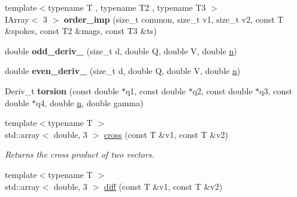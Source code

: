 \begin{DoxyCompactItemize}
\item 
{\footnotesize template$<$typename T , typename T2 , typename T3 $>$ }\\I\+Array$<$ 3 $>$ {\bfseries order\+\_\+imp} (size\+\_\+t common, size\+\_\+t v1, size\+\_\+t v2, const T \&spokes, const T2 \&mags, const T3 \&ts)\hypertarget{namespaceFManII_abbb76098dc0ce293eb77c39ea451ecec}{}\label{namespaceFManII_abbb76098dc0ce293eb77c39ea451ecec}

\item 
double {\bfseries odd\+\_\+deriv\+\_\+} (size\+\_\+t d, double Q, double V, double \hyperlink{namespaceFManII_ab331802fde4c5f2564443f1704c25363a351f38f2149aa0e3be56f7c5aa16eae9}{n})\hypertarget{namespaceFManII_a4d1c3cdc99779ef25b59ec9bce04bc3f}{}\label{namespaceFManII_a4d1c3cdc99779ef25b59ec9bce04bc3f}

\item 
double {\bfseries even\+\_\+deriv\+\_\+} (size\+\_\+t d, double Q, double V, double \hyperlink{namespaceFManII_ab331802fde4c5f2564443f1704c25363a351f38f2149aa0e3be56f7c5aa16eae9}{n})\hypertarget{namespaceFManII_a15ad94b985d81cac64aaca5c84f8d06e}{}\label{namespaceFManII_a15ad94b985d81cac64aaca5c84f8d06e}

\item 
Deriv\+\_\+t {\bfseries torsion} (const double $\ast$q1, const double $\ast$q2, const double $\ast$q3, const double $\ast$q4, double \hyperlink{namespaceFManII_ab331802fde4c5f2564443f1704c25363a351f38f2149aa0e3be56f7c5aa16eae9}{n}, double gamma)\hypertarget{namespaceFManII_a4d60b97475fdf4736295110c685e1f8b}{}\label{namespaceFManII_a4d60b97475fdf4736295110c685e1f8b}

\item 
{\footnotesize template$<$typename T $>$ }\\std\+::array$<$ double, 3 $>$ \hyperlink{namespaceFManII_ab6c3ba0221d1479590c328071add3a69}{cross} (const T \&v1, const T \&v2)\hypertarget{namespaceFManII_ab6c3ba0221d1479590c328071add3a69}{}\label{namespaceFManII_ab6c3ba0221d1479590c328071add3a69}

\begin{DoxyCompactList}\small\item\em Returns the cross product of two vectors. \end{DoxyCompactList}\item 
{\footnotesize template$<$typename T $>$ }\\std\+::array$<$ double, 3 $>$ \hyperlink{namespaceFManII_a67d2288b51cdc78b0569812bbbe7603c}{diff} (const T \&v1, const T \&v2)\hypertarget{namespaceFManII_a67d2288b51cdc78b0569812bbbe7603c}{}\label{namespaceFManII_a67d2288b51cdc78b0569812bbbe7603c}


\end{DoxyCompactItemize}
